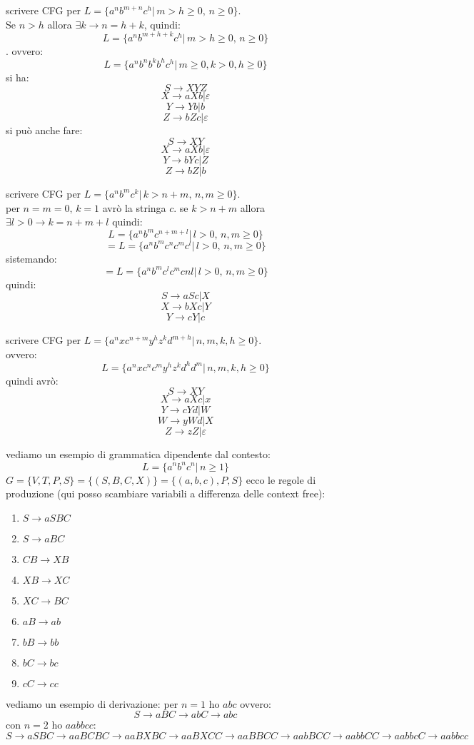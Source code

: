 \documentclass[a4paper,12pt, oneside]{book}
\begin{document}
\begin{esempio}
scrivere CFG per $L=\{a^nb^{m+n}c^h|\, m>h\geq0,\, n\geq0\}
$.\\
Se $n>h$ allora $\exists k \to n= h+k$, quindi:
$$L=\{a^nb^{m+h+k}c^h|\, m>h\geq0,\, n\geq0\}$$. ovvero:
$$L=\{a^nb^nb^kb^hc^h|\, m\geq 0, k>0, h\geq 0\}$$
si ha:
$$S\to XYZ$$
$$X\to aXb|\varepsilon$$
$$Y\to Yb|b$$
$$Z\to bZc|\varepsilon$$
si può anche fare:
$$S\to XY$$
$$X\to aXb|\varepsilon$$
$$Y\to bYc|Z$$
$$Z\to bZ|b$$
\end{esempio}
\begin{esempio}
scrivere CFG per $L=\{a^nb^mc^k|\, k>n+m,\, n,m\geq 0\}
$.\\
per $n=m=0,\, k=1$ avrò la stringa $c$.
se $k>n+m$ allora $\exists l>0\to k=n+m+l$ quindi:
$$L=\{a^nb^mc^{n+m+l}|\, l>0,\, n,m\geq 0\}
$$
$$=L=\{a^nb^mc^nc^mc^l|\, l>0,\, n,m\geq 0\}$$
sistemando:
$$=L=\{a^nb^mc^lc^mcnl|\, l>0,\, n,m\geq 0\}$$
quindi:
$$S\to aSc|X$$
$$X\to bXc|Y$$
$$Y\to cY|c$$
\end{esempio}
\newpage
\begin{esempio}
scrivere CFG per $L=\{a^nxc^{n+m}y^hz^kd^{m+h}|\, n,m,k,h\geq 0\}
$.\\
ovvero:
$$L=\{a^nxc^nc^my^hz^kd^hd^m|\, n,m,k,h\geq 0\}$$
quindi avrò:
$$S\to XY$$
$$X\to aXc|x$$
$$Y\to cYd|W$$
$$W\to yWd|X$$
$$Z\to zZ|\varepsilon$$
\end{esempio}
\begin{esempio}
vediamo un esempio di grammatica dipendente dal contesto:
$$L=\{a^nb^nc^n|\, n\geq 1\}$$
$G=\{V,T,P,S\}=\{(S,B,C,X)\}=\{(a,b,c),P,S\}$
ecco le regole di produzione (qui posso scambiare variabili a differenza delle context free):
\begin{enumerate}
\item $S\to aSBC$
\item $S\to aBC$
\item $CB\to XB$
\item $XB\to XC$
\item $XC\to BC$
\item $aB\to ab$
\item $bB\to bb$
\item $bC\to bc$
\item $cC\to cc$
\end{enumerate}
vediamo un esempio di derivazione:
per $n=1$ ho $abc$ ovvero:
$$S\to aBC\to abC\to abc$$
con $n=2$ ho $aabbcc$:
$S\to aSBC\to aaBCBC\to aaBXBC\to aaBXCC\to aaBBCC\to aabBCC\to aabbCC\to aabbcC\to aabbcc$\\
\end{esempio}
\end{document}
